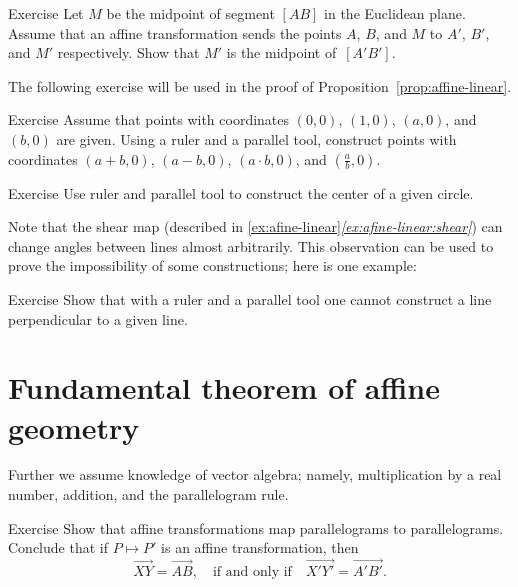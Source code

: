 \begin{thm}{Exercise}\label{ex:midpoint-affine}
Let $M$ be the midpoint of segment $[AB]$ in the Euclidean plane.
Assume that an affine transformation sends the points $A$, $B$, and $M$
to $A'$, $B'$, and $M'$ respectively.
Show that $M'$ is the midpoint of~$[A'B']$.
\end{thm}

The following exercise will be used in the proof of Proposition~\ref{prop:affine-linear}.

\begin{thm}{Exercise}\label{ex:R-hom}
Assume that points with coordinates $(0,0)$, $(1,0)$, $(a,0)$, and $(b,0)$ are given.
Using a ruler and a parallel tool, construct points with coordinates $(a+b,0)$, $(a-b,0)$, $(a\cdot b,0)$, and $(\tfrac a b,0)$.
\end{thm}

\begin{thm}{Exercise}\label{ex:center-circ-affine}
Use ruler and parallel tool to construct the center of a given circle.
\end{thm}

Note that the shear map (described in \ref{ex:afine-linear}\textit{\ref{ex:afine-linear:shear}}) can change angles between lines almost arbitrarily.
This observation can be used to prove the impossibility of some constructions;
here is one example:

\begin{thm}{Exercise}\label{ex:affine-perp}
Show that with a ruler and a parallel tool one cannot construct a line perpendicular to a given line.
\end{thm}

\section{Fundamental theorem of affine geometry}

Further we assume knowledge of vector algebra; namely, multiplication by a real number, addition, and the parallelogram rule.

\begin{thm}{Exercise}\label{ex:parallelogram-rule}
Show that affine transformations map parallelograms to parallelograms.
Conclude that if $P\mapsto P'$ is an affine transformation, then
\[\overrightarrow{XY}=\overrightarrow{AB},
\quad\text{if and only if}\quad
\overrightarrow{X'Y'}=\overrightarrow{A'B'}.\]

\end{thm}


